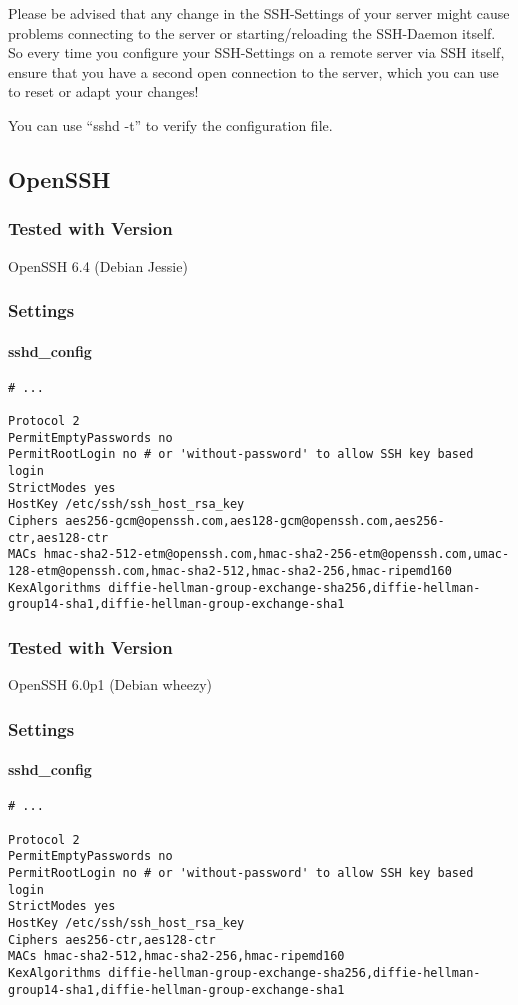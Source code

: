 \begin{mdframed}[style=warningboxstyle]
	Please be advised that any change in the SSH-Settings of your server might cause problems connecting to the server or starting/reloading the SSH-Daemon itself.
	So every time you configure your SSH-Settings on a remote server via SSH itself, ensure that you have a second open connection to the server, which you can use to reset or adapt your changes!

        You can use ``sshd -t'' to verify the configuration file.
\end{mdframed}

\subsection{OpenSSH}

\subsubsection{Tested with Version} OpenSSH 6.4 (Debian Jessie)
\subsubsection{Settings}
\paragraph*{sshd\_config}
\begin{lstlisting}[breaklines]
# ...

Protocol 2
PermitEmptyPasswords no
PermitRootLogin no # or 'without-password' to allow SSH key based login
StrictModes yes
HostKey /etc/ssh/ssh_host_rsa_key
Ciphers aes256-gcm@openssh.com,aes128-gcm@openssh.com,aes256-ctr,aes128-ctr
MACs hmac-sha2-512-etm@openssh.com,hmac-sha2-256-etm@openssh.com,umac-128-etm@openssh.com,hmac-sha2-512,hmac-sha2-256,hmac-ripemd160
KexAlgorithms diffie-hellman-group-exchange-sha256,diffie-hellman-group14-sha1,diffie-hellman-group-exchange-sha1
\end{lstlisting}
\subsubsection{Tested with Version} OpenSSH 6.0p1 (Debian wheezy)
\subsubsection{Settings}
\paragraph*{sshd\_config}
\begin{lstlisting}[breaklines]
# ...

Protocol 2
PermitEmptyPasswords no
PermitRootLogin no # or 'without-password' to allow SSH key based login
StrictModes yes
HostKey /etc/ssh/ssh_host_rsa_key
Ciphers aes256-ctr,aes128-ctr
MACs hmac-sha2-512,hmac-sha2-256,hmac-ripemd160
KexAlgorithms diffie-hellman-group-exchange-sha256,diffie-hellman-group14-sha1,diffie-hellman-group-exchange-sha1
\end{lstlisting}

